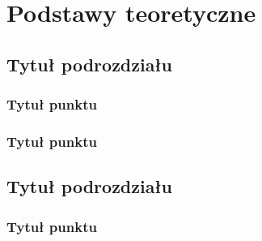\chapter{Podstawy teoretyczne}
\label{chap:podstawy}


\section{Tytuł podrozdziału}

\subsection{Tytuł punktu}


\subsection{Tytuł punktu}


\section{Tytuł podrozdziału}

\subsection{Tytuł punktu}

